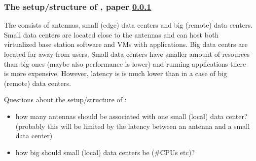 \subsubsection{The setup/structure of \xcloud, paper \ref{paper:topology}}
\label{paper:topology}
The \xcloud consists of antennas, small (edge) data centers and big (remote) data centers.
Small data centers are located close to the antennas and can host both virtualized base station software and VMs with applications.
Big data centrs are located far away from users.
Small data centers have smaller amount of resources than big ones (maybe also performance is lower) and running applications there is more expensive.
However, latency is is much lower than in a case of big (remote) data centers.

Questions about the setup/structure of \xcloud:
\begin{itemize}
\item how many antennas should be associated with one small (local) data center? (probably this will be limited by the latency between an antenna and a small data center)
\item how big should small (local) data centers be (\#CPUs etc)?
\end{itemize}